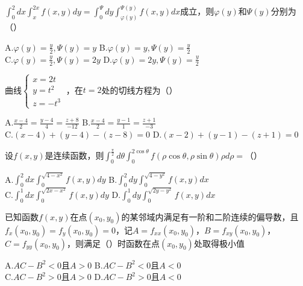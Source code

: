 \documentclass[quiet]{ctexart}
\begin{document}
\begin{problem}
  $\int_{0}^{2}{dx}\int_{x}^{2x}{f(x,y)dy} = \int_{0}^{\Psi}{dy}\int_{\varphi(y)}^{\Psi(y)}{f(x,y)dx}$成立，则$\varphi(y)$和$\Psi(y)$分别为（）
        
        A.$\varphi(y) = \frac{y}{2},\Psi(y) = y$ \quad B.$\varphi(y) = y,\Psi(y) = \frac{y}{2}$ \\
        C.$\varphi(y) = \frac{y}{2},\Psi(y) = 2y$ \quad D.$\varphi(y) = 2y,\Psi(y) = \frac{y}{2}$
\end{problem}

\begin{problem}
  曲线$\left\{ \begin{array}{r}
    x = 2t \\
    y = t^{2} \\
    z = - t^{3}
    \end{array} \right.\ $，在$t = 2$处的切线方程为（）
    
    A.$\frac{x - 4}{2} = \frac{y - 4}{4} = \frac{z + 8}{- 12}$ \quad B.$\frac{x - 4}{2} = \frac{y - 1}{1} = \frac{z + 1}{- 3}$ \\
    C.$(x - 4) + (y - 4) - (z - 8) = 0$ \quad D.$(x - 2) + (y - 1) - (z + 1) = 0$
\end{problem}

\begin{problem}
  设$f(x,y)$是连续函数，则$\int_{0}^{\frac{\pi}{2}}{d\theta}\int_{0}^{2\cos\theta}{f(\rho\cos\theta,\rho\sin\theta)\rho d\rho} =$（）
        
        A.$\int_{0}^{2}{dx}\int_{0}^{\sqrt{4 - x^{2}}}{f(x,y)dy}$ \quad B.$\int_{0}^{2}{dy}\int_{0}^{\sqrt{4 - y^{2}}}{f(x,y)dx}$ \\
        C.$\int_{0}^{1}{dx}\int_{0}^{\sqrt{2x - x^{2}}}{f(x,y)dy}$ \quad D.$\int_{0}^{1}{dy}\int_{0}^{\sqrt{2y - y^{2}}}{f(x,y)dx}$
\end{problem}

\begin{problem}
  已知函数$f(x,y)$在点$(x_{0},y_{0})$的某邻域内满足有一阶和二阶连续的偏导数，且$f_{x}(x_{0},y_{0}) = f_{y}(x_{0},y_{0}) = 0$，记$A = f_{xx}(x_{0},y_{0})$，$B = f_{xy}(x_{0},y_{0})$，$C = f_{yy}(x_{0},y_{0})$，则满足（）时函数在点$(x_{0},y_{0})$处取得极小值
        
        A.$AC - B^{2} < 0$且$A > 0$ \quad B.$AC - B^{2} < 0$且$A < 0$ \\
        C.$AC - B^{2} > 0$且$A > 0$ \quad D.$AC - B^{2} > 0$且$A < 0$
\end{problem}
\end{document}
